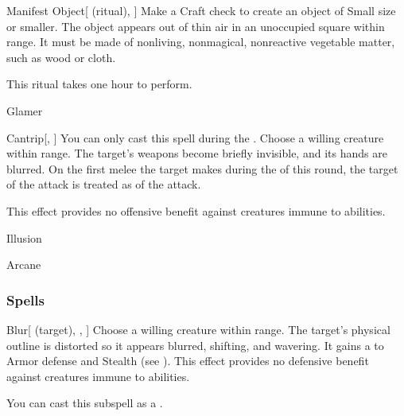 \begin{ability}[\nth{2}]{Manifest Object}[ (ritual), ]
Make a Craft check to create an object of Small size or smaller.
The object appears out of thin air in an unoccupied square within \rngclose range.
It must be made of nonliving, nonmagical, nonreactive vegetable matter, such as wood or cloth.

This ritual takes one hour to perform.
\end{ability}
\vspace{0.25em}


\newpage
\begin{spellsection}{Glamer}

\begin{spellheader}
\spelldesc{}
\end{spellheader}


\begin{ability}{Cantrip}[, ]
You can only cast this spell during the .
Choose a willing creature within \rngclose range.
The target's weapons become briefly invisible, and its hands are blurred.
On the first melee  the target makes during the  of this round, the target of the attack is treated as  of the attack.

This effect provides no offensive benefit against creatures immune to  abilities.
\end{ability}




 Illusion

 Arcane
\end{spellsection}


\subsubsection{Spells}


\begin{ability}[\nth{1}]{Blur}[ (target), , ]
Choose a willing creature within \rngmed range.
The target's physical outline is distorted so it appears blurred, shifting, and wavering.
It gains a   to Armor defense and Stealth (see ).
This effect provides no defensive benefit against creatures immune to  abilities.

You can cast this subspell as a .
\end{ability}
\vspace{0.25em}




